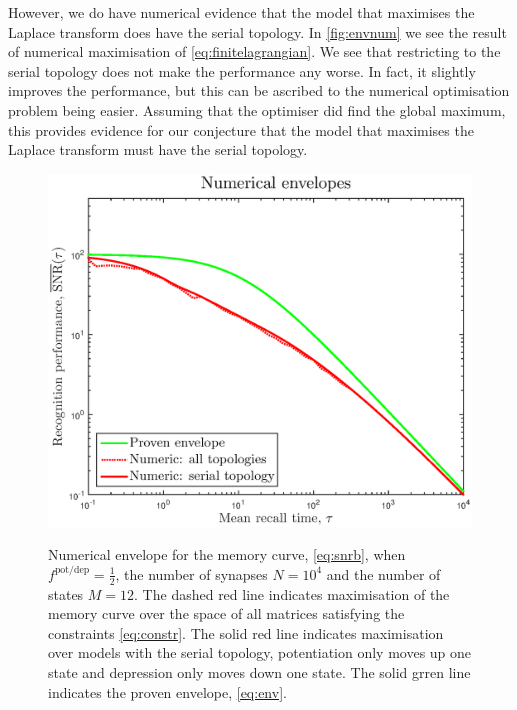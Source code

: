 \documentclass[12pt]{article}
\newcommand{\potdep}{^{\text{pot/dep}}}
\begin{document}
However, we do have numerical evidence that the model that maximises the Laplace transform does have the serial topology.
In \autoref{fig:envnum} we see the result of numerical maximisation of \eqref{eq:finitelagrangian}.
We see that restricting to the serial topology does not make the performance any worse.
In fact, it slightly improves the performance, but this can be ascribed to the numerical optimisation problem being easier.
Assuming that the optimiser did find the global maximum, this provides evidence for our conjecture  that the model that maximises the Laplace transform must have the serial topology.


\begin{figure}[tb]
  \centering
  \includegraphics[width=0.8\linewidth]{LenvNum.eps}\\
  \caption[Numerical envelope]{Numerical envelope for the memory curve, \eqref{eq:snrb}, when $f\potdep=\frac{1}{2}$, the number of synapses $N=10^4$ and the number of states $M=12$.
  The dashed red line indicates maximisation of the memory curve over the space of all matrices satisfying the constraints \eqref{eq:constr}.
  The solid red line indicates maximisation over models with the serial topology, \ie potentiation only moves up one state and depression only moves down one state.
  The solid grren line indicates the proven envelope, \eqref{eq:env}.}\label{fig:envnum}
\end{figure}
\end{document}
